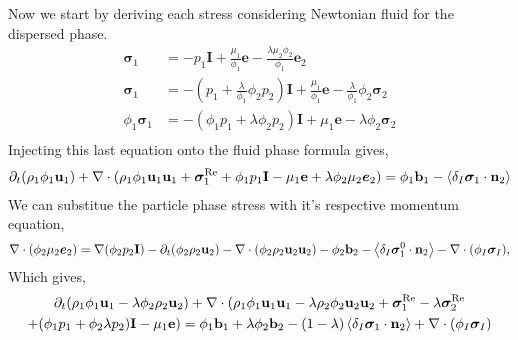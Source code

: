 Now we start by deriving each stress considering Newtonian fluid for the dispersed phase. 
\begin{align*}
    \bm{\sigma}_1 
    &= - p_1 \textbf{I}
    + \frac{\mu_1 }{\phi_1} \textbf{e}
    - \frac{\lambda \mu_2 \phi_2}{\phi_1} \textbf{e}_2\\
    \bm{\sigma}_1 
    &= - \left(p_1 + \frac{\lambda }{\phi_1}\phi_2 p_2\right) \textbf{I}
    + \frac{\mu_1}{\phi_1} \textbf{e}
    - \frac{\lambda }{\phi_1} \phi_2 \bm{\sigma}_2 \\
    \phi_1 \bm{\sigma}_1 
    &= - (\phi_1 p_1+ \lambda \phi_2 p_2) \textbf{I}
    + \mu_1 \textbf{e}
    - \lambda \phi_2 \bm{\sigma}_2\\
\end{align*}
Injecting this last equation onto the fluid phase formula gives, 
\begin{align*}
    \partial_t (\rho_1\phi_1 \textbf{u}_1 )
    + \mathbf{\nabla}\cdot (\rho_1\phi_1 \textbf{u}_1  \textbf{u}_1
    + \bm{\sigma}^\text{Re}_1 
    + \phi_1 p_1 \textbf{I}
    - \mu_1 \textbf{e}
    + \lambda \phi_2 \mu_2 \bm{e}_2)
    &= 
    \phi_1 \textbf{b}_1
    - \left<\delta_I \bm{\sigma}_1 \cdot \textbf{n}_2\right> \\
\end{align*}
We can substitue the particle phase stress with it's respective momentum equation,
\begin{equation*}    
\mathbf{\nabla}\cdot (\phi_2 \mu_2 \bm{e}_2)
=  
\mathbf{\nabla} (\phi_2 p_2 \textbf{I})
-\partial_t (\phi_2\rho_2 \textbf{u}_2)
- \mathbf{\nabla}\cdot (\phi_2\rho_2 \textbf{u}_2 \textbf{u}_2)
- \phi_2 \textbf{b}_2 
- \left<\delta_I
    \bm{\sigma}_1^0
\cdot \textbf{n}_2\right>
- \mathbf{\nabla}\cdot (\phi_I \bm{\sigma}_I) ,
\end{equation*}
Which gives, 
\begin{multline*}
    \partial_t (\rho_1\phi_1 \textbf{u}_1 -\lambda \phi_2 \rho_2 \textbf{u}_2  )
    + \mathbf{\nabla}\cdot (
        \rho_1\phi_1 \textbf{u}_1  \textbf{u}_1
        - \lambda\rho_2\phi_2 \textbf{u}_2  \textbf{u}_2
    + \bm{\sigma}^\text{Re}_1 - \lambda \bm{\sigma}^\text{Re}_2 \\
    + (\phi_1 p_1 + \phi_2 \lambda p_2) \textbf{I}
    - \mu_1 \textbf{e})
    = 
    \phi_1  \textbf{b}_1
    + \lambda \phi_2  \textbf{b}_2
    - (1-\lambda)\left<\delta_I \bm{\sigma}_1 \cdot \textbf{n}_2\right>
    + \mathbf{\nabla}\cdot (\phi_I \bm{\sigma}_I) \\
\end{multline*}


